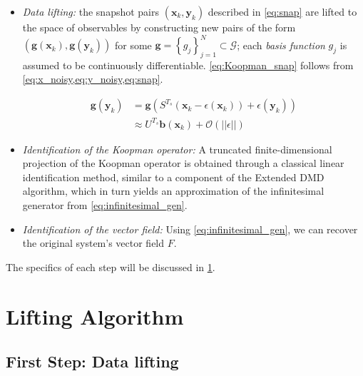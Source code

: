 \documentclass{article}
\begin{document}
        \begin{itemize}
            \item \textit{Data lifting:} the snapshot pairs $\left(\mathbf{x}_k,\mathbf{y}_k\right)$ described in \cref{eq:snap} are lifted to the space of observables by constructing new pairs of the form\\$\left(\mathbf{g}\left(\mathbf{x}_k\right),\mathbf{g}\left(\mathbf{y}_k\right)\right)$ for some $\mathbf{g} = \left\{g_j\right\}_{j=1}^{N} \subset \mathcal{G}$; each \textit{basis function} $g_j$ is assumed to be continuously differentiable. \cref{eq:Koopman_snap} follows from \cref{eq:x_noisy,eq:y_noisy,eq:snap}.
            
            \begin{align} \label{eq:Koopman_snap}
                \mathbf{g} \left(\mathbf{y}_k\right) &= \mathbf{g} \left(S^{T_s} \left(\mathbf{x}_k - \epsilon\left(\mathbf{x}_k\right)\right) + \epsilon\left(\mathbf{y}_k\right)\right)
                \\
                & \approx U^{T_s} \mathbf{b}\left(\mathbf{x}_k\right) + \mathcal{O} \left(\left|\left|\epsilon\right|\right|\right)
            \end{align}

            \item \textit{Identification of the Koopman operator:} A truncated finite-dimensional projection of the Koopman operator is obtained through a classical linear identification method, similar to a component of the Extended DMD algorithm\cite{EDMD}, which in turn yields an approximation of the infinitesimal generator from \ref{eq:infinitesimal_gen}.
            
            \item \textit{Identification of the vector field:} Using \ref{eq:infinitesimal_gen}, we can recover the original system's vector field $F$.
        \end{itemize}

        The specifics of each step will be discussed in \cref{sec:algorithm}.

\section{Lifting Algorithm} \label{sec:algorithm}

    \subsection{First Step: Data lifting}
\end{document}
